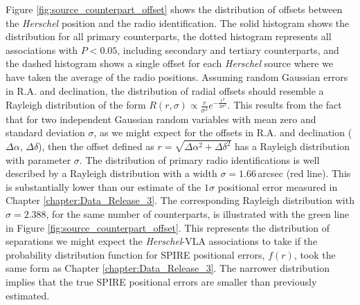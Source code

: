 Figure \ref{fig:source_counterpart_offset} shows the distribution of offsets between the \textit{Herschel} position and the radio identification. The solid histogram shows the distribution for all primary counterparts, the dotted histogram represents all associations with $P < 0.05$, including secondary and tertiary counterparts, and the dashed histogram shows a single offset for each \textit{Herschel} source where we have taken the average of the radio positions. Assuming random Gaussian errors in R.A. and declination, the distribution of radial offsets should resemble a Rayleigh distribution of the form $R(r, \sigma) \propto \frac{r}{\sigma^2}e^{-\frac{r^2}{2\sigma^2}}$. This results from the fact that for two independent Gaussian random variables with mean zero and standard deviation $\sigma$, as we might expect for the offsets in R.A. and declination ($\Delta\alpha$, $\Delta\delta$), then the offset defined as $r = \sqrt{\Delta\alpha^2 + \Delta\delta^2}$ has a Rayleigh distribution with parameter $\sigma$. The distribution of primary radio identifications is well described by a Rayleigh distribution with a width $\sigma = 1.66\,$arcsec (red line). This is substantially lower than our estimate of the $1\sigma$ positional error measured in Chapter \ref{chapter:Data_Release_3}. The corresponding Rayleigh distribution with $\sigma = 2.388$, for the same number of counterparts, is illustrated with the green line in Figure \ref{fig:source_counterpart_offset}. This represents the distribution of separations we might expect the \textit{Herschel}-VLA associations to take if the probability distribution function for SPIRE positional errors, $f(r)$, took the same form as Chapter \ref{chapter:Data_Release_3}. The narrower distribution implies that the true SPIRE positional errors are smaller than previously estimated.

